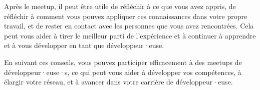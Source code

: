 Après le meetup, il peut être utile de réfléchir à ce que vous avez appris, de réfléchir à comment vous pouvez appliquer ces connaissances dans votre propre travail, et de rester en contact avec les personnes que vous avez rencontrées. Cela peut vous aider à tirer le meilleur parti de l'expérience et à continuer à apprendre et à vous développer en tant que développeur·euse.

En suivant ces conseils, vous pouvez participer efficacement à des meetups de développeur·euse·s, ce qui peut vous aider à développer vos compétences, à élargir votre réseau, et à avancer dans votre carrière de développeur·euse.

